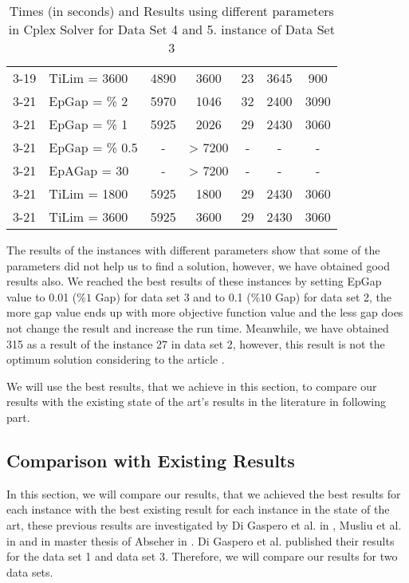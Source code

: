 \begin{table}
\begin{tabular}{llccccc}
3-19 &  TiLim = 3600	& 4890 & 3600 & 23 & 3645  & 900  \\

3-21 &  EpGap =   \% 2 	& 5970 & 1046 & 32 & 2400  & 3090 \\

3-21 &  EpGap =  \% 1 	& 5925 & 2026 & 29 & 2430  & 3060 \\

3-21 &  EpGap =   \% 0.5 	& - & > 7200 & - & -  & - \\

3-21 &  EpAGap = 30  	& - & > 7200 & - & -  & - \\

3-21 &  TiLim =  1800	& 5925 	&  1800 & 29 & 2430  & 3060 \\

3-21 &  TiLim = 3600	& 5925 	&  3600	& 29 & 2430  & 3060 \\
\hline
\end{tabular}
\caption{Times (in seconds) and Results using different parameters in Cplex Solver for Data Set 4 and 5. instance of Data Set 3}
\label{tbl:parameter}
\end{table}

The results of the instances with different parameters show that some of the parameters did not help us to find a solution, however, we have obtained good results also. We reached the best results of these instances by setting EpGap value to 0.01 ($\%1$ Gap) for data set 3 and to 0.1 ($\%10$ Gap) for data set 2, the more gap value ends up with more objective function value and the less gap does not change the result and increase the run time. Meanwhile, we have obtained 315 as a result of the instance 27 in data set 2, however, this result is not the optimum solution considering to the article \cite{li:2010:abseher}.


We will use the best results, that we achieve in this section, to compare our results with the existing state of the art's results in the literature in following part.


\subsection{Comparison with Existing Results}

In this section, we will compare  our results, that we achieved the best results for each instance with the best existing result for each instance in the state of the art, these previous results are investigated by Di Gaspero et al. in \cite{li:2007:gaspero}, Musliu et al. in \cite{li:2004:musliu} and in master thesis of Abseher in \cite{li:2010:abseher}.  Di Gaspero et al. published their results for the data set 1 and data set 3. Therefore, we will compare our results for two data sets. 

